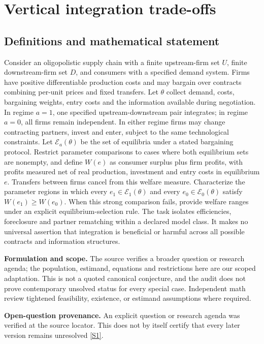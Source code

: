 \documentclass[11pt]{article}
\newcommand{\sref}[2]{\hyperlink{source:#1:#2}{[S#2]}}
\begin{document}
\section*{Vertical integration trade-offs}\label{30007678}
\subsection{Definitions and mathematical statement}
Consider an oligopolistic supply chain with a finite upstream-firm set \(U\), finite downstream-firm set \(D\), and consumers with a specified demand system. Firms have positive differentiable production costs and may bargain over contracts combining per-unit prices and fixed transfers. Let \(\theta\) collect demand, costs, bargaining weights, entry costs and the information available during negotiation. In regime \(a=1\), one specified upstream-downstream pair integrates; in regime \(a=0\), all firms remain independent. In either regime firms may change contracting partners, invest and enter, subject to the same technological constraints. Let \(\mathcal E_a(\theta)\) be the set of equilibria under a stated bargaining protocol. Restrict parameter comparisons to cases where both equilibrium sets are nonempty, and define \(W(e)\) as consumer surplus plus firm profits, with profits measured net of real production, investment and entry costs in equilibrium \(e\). Transfers between firms cancel from this welfare measure. Characterize the parameter regions in which every \(e_1\in\mathcal E_1(\theta)\) and every \(e_0\in\mathcal E_0(\theta)\) satisfy \(W(e_1)\geq W(e_0)\). When this strong comparison fails, provide welfare ranges under an explicit equilibrium-selection rule. The task isolates efficiencies, foreclosure and partner rematching within a declared model class. It makes no universal assertion that integration is beneficial or harmful across all possible contracts and information structures.

\par\textbf{Formulation and scope.} The source verifies a broader question or research agenda; the population, estimand, equations and restrictions here are our scoped adaptation. This is not a quoted canonical conjecture, and the audit does not prove contemporary unsolved status for every special case. Independent math review tightened feasibility, existence, or estimand assumptions where required.

\par\textbf{Open-question provenance.} An explicit question or research agenda was verified at the source locator. This does not by itself certify that every later version remains unresolved \sref{30007678}{1}.
\end{document}

